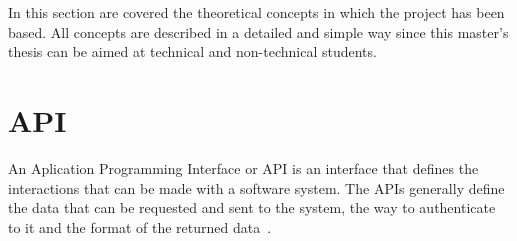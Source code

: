 

\nonzeroparskip In this section are covered the theoretical concepts in which the project has been based. All concepts are described in a detailed and simple way since this master's thesis can be aimed at technical and non-technical students.

\section{API}

\nonzeroparskip An Aplication Programming Interface or API is an interface that defines the interactions that can be made with a software system. The APIs generally define the data that can be requested and sent to the system, the way to authenticate to it and the format of the returned data~\cite{ibm_restapi}.

